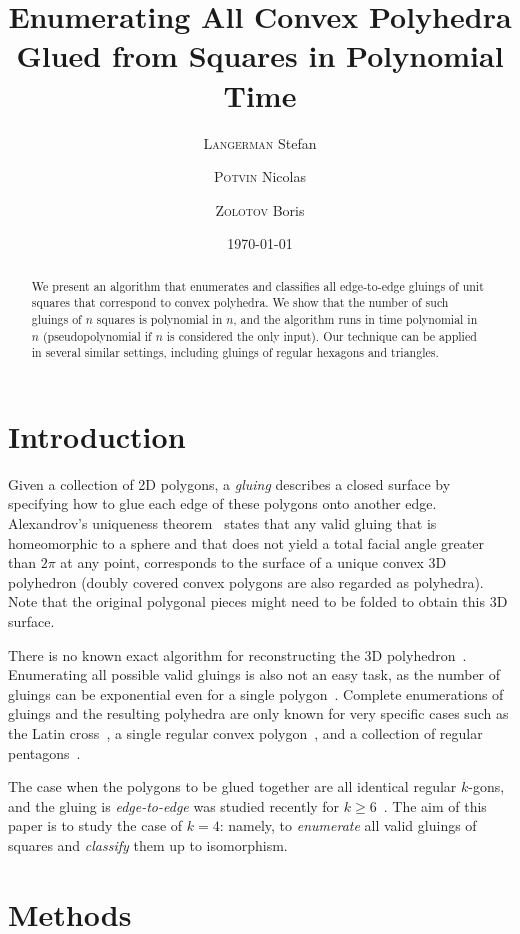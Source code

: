 \documentclass[a4paper,11pt]{article}
\title{Enumerating All Convex Polyhedra Glued from Squares in Polynomial Time}
\author{{\scshape Langerman} Stefan\and {\scshape Potvin} Nicolas \and {\scshape Zolotov} Boris}
\date{\today}
\begin{document}
 \maketitle

\begin{abstract}We present an algorithm that enumerates and classifies all edge-to-edge gluings of unit squares that correspond to convex polyhedra. We show that the number of such gluings of $n$ squares is polynomial in $n$, and the algorithm runs in time polynomial in $n$ (pseudopolynomial if $n$ is considered the only input). Our technique can be applied in several similar settings, including gluings of regular hexagons and triangles.\end{abstract}

\section{Introduction}

Given a collection of 2D polygons, a \emph{gluing} describes a closed surface by specifying how to glue each edge of these polygons onto another edge. Alexandrov's uniqueness theorem~\cite{alex} states that any valid gluing that is homeomorphic to a sphere and that does not yield a total facial angle greater than $2\pi$ at any point, corresponds to the surface of a unique convex 3D polyhedron (doubly covered convex polygons are also regarded as polyhedra). Note that the original polygonal pieces might need to be folded to obtain this 3D surface.

There is no known exact algorithm for reconstructing the 3D polyhedron~\cite{bannister2014galois,kpd09-approx}. Enumerating all possible valid gluings is also not an easy task, as the number of gluings can be exponential even for a single polygon~\cite{DDLO02}. Complete enumerations of gluings and the resulting polyhedra are only known for very specific cases such as the Latin cross~\cite{ddlop99}, a single regular convex polygon~\cite{DO07}, and a collection of regular pentagons~\cite{alz-penta}.

The case when the polygons to be glued together are all identical regular $k$-gons, and the gluing is \emph{edge-to-edge} was studied recently for $k \ge 6$~\cite{kl17-hex}. The aim of this paper is to study the case of $k=4$: namely, to {\it enumerate} all valid gluings of squares and {\it classify} them up to isomorphism.

\section{Methods}
\end{document}

